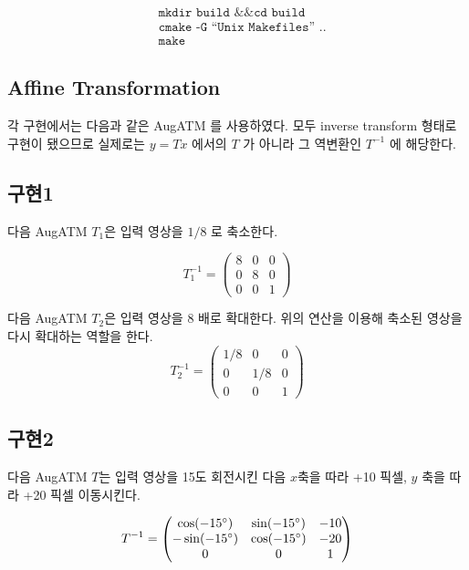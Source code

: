 \documentclass[a4paper, 12p]{paper}
\def\code#1{\texttt{#1}}
\begin{document}
\begin{align*}
  & \code{mkdir build \&\& cd build} \\
  & \code{cmake -G ``Unix Makefiles'' ..} \\
  & \code{make}
\end{align*}

\subsection{Affine Transformation}
각 구현에서는 다음과 같은 AugATM 를 사용하였다. 모두 inverse transform 형태로 구현이 됐으므로 실제로는 $y=Tx$ 에서의 $T$ 가 아니라 그 역변환인 $T^{-1}$ 에 해당한다.

\subsection{구현1}
다음 AugATM $T_1$은 입력 영상을 $1/8$ 로 축소한다.

\begin{equation}
  T_1^{-1} = 
  \begin{pmatrix}
    8 & 0 & 0 \\
    0 & 8 & 0 \\
    0 & 0 & 1
  \end{pmatrix}
\end{equation}

다음 AugATM $T_2$은 입력 영상을 $8$ 배로 확대한다. 위의 연산을 이용해 축소된 영상을 다시 확대하는 역할을 한다.
\begin{equation}
  T_2^{-1} = 
  \begin{pmatrix}
    1/8 & 0   & 0 \\
    0   & 1/8 & 0 \\
    0   &  0  & 1
  \end{pmatrix}
\end{equation}

\subsection{구현2}
다음 AugATM $T$는 입력 영상을 15도 회전시킨 다음 $x$축을 따라 +10 픽셀, $y$ 축을 따라 +20 픽셀 이동시킨다.

\begin{equation}
  T^{-1} = 
  \begin{pmatrix}
    \cos(-15 \degree)  & \sin(-15 \degree) & -10 \\
    -\sin(-15 \degree) & \cos(-15 \degree) & -20 \\
    0                  & 0                 & 1 
  \end{pmatrix}
\end{equation}
\end{document}
